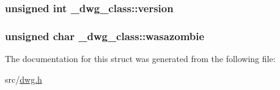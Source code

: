 \hypertarget{struct__dwg__class_a1d7935bc0af8dd01ff07a8f40d5f86ad}{
\subsubsection[{version}]{\setlength{\rightskip}{0pt plus 5cm}unsigned int {\bf \-\_\-dwg\-\_\-class\-::version}}}\label{struct__dwg__class_a1d7935bc0af8dd01ff07a8f40d5f86ad}
\hypertarget{struct__dwg__class_a2adf59013bca7c0135b6442739d90625}{
\subsubsection[{wasazombie}]{\setlength{\rightskip}{0pt plus 5cm}unsigned char {\bf \-\_\-dwg\-\_\-class\-::wasazombie}}}\label{struct__dwg__class_a2adf59013bca7c0135b6442739d90625}


\-The documentation for this struct was generated from the following file\-:\begin{DoxyCompactItemize}
\item 
src/\hyperlink{dwg_8h}{dwg.\-h}\end{DoxyCompactItemize}
